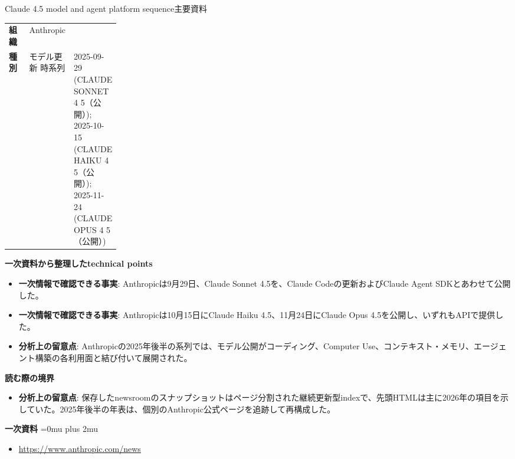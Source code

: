 \begin{technicalnote}{Claude 4.5 model and agent platform sequence}{主要資料}
\begingroup
\begin{tabularx}{\linewidth}{@{}>{\bfseries}p{0.22\linewidth}X@{}}
組織 & Anthropic \\
種別 & モデル更新
時系列 & 2025-09-29 (CLAUDE SONNET 4 5（公開）); 2025-10-15 (CLAUDE HAIKU 4 5（公開）); 2025-11-24 (CLAUDE OPUS 4 5（公開）) \\
\end{tabularx}
\smallskip
{\bfseries 一次資料から整理したtechnical points}
\begin{itemize}[leftmargin=1.5em,itemsep=0.35em]
\item \textbf{一次情報で確認できる事実}: Anthropicは9月29日、Claude Sonnet 4.5を、Claude Codeの更新およびClaude Agent SDKとあわせて公開した。
\item \textbf{一次情報で確認できる事実}: Anthropicは10月15日にClaude Haiku 4.5、11月24日にClaude Opus 4.5を公開し、いずれもAPIで提供した。
\item \textbf{分析上の留意点}: Anthropicの2025年後半の系列では、モデル公開がコーディング、Computer Use、コンテキスト・メモリ、エージェント構築の各利用面と結び付いて展開された。
\end{itemize}
\begin{minipage}{\linewidth}
{\bfseries 読む際の境界}
\begin{itemize}[leftmargin=1.5em,itemsep=0.35em]
\item \textbf{分析上の留意点}: 保存したnewsroomのスナップショットはページ分割された継続更新型indexで、先頭HTMLは主に2026年の項目を示していた。2025年後半の年表は、個別のAnthropic公式ページを追跡して再構成した。
\end{itemize}
\begin{samepage}
{\bfseries 一次資料}
\begingroup\sloppy
\Urlmuskip=0mu plus 2mu\relax
\begin{itemize}[leftmargin=1.5em,itemsep=0.25em]
\item {\scriptsize\url{https://www.anthropic.com/news}}
\end{itemize}
\endgroup
\end{samepage}
\end{minipage}
\endgroup
\end{technicalnote}
\medskip

